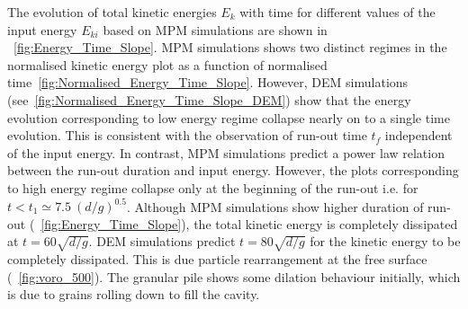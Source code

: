 The evolution of total kinetic energies $E_k$ with time for different values of 
the input energy $E_{ki}$ based on MPM simulations are shown in 
~\cref{fig:Energy_Time_Slope}. MPM simulations shows two distinct regimes in 
the normalised kinetic energy plot as a function of 
normalised time~\cref{fig:Normalised_Energy_Time_Slope}. However, DEM 
simulations (see~\cref{fig:Normalised_Energy_Time_Slope_DEM}) show that the 
energy evolution corresponding to low energy regime collapse nearly on to a 
single time evolution. This is consistent with the observation of run-out time 
$t_f$ independent of the input energy. In contrast, MPM simulations predict a 
power law relation between the run-out duration and input energy. However, the 
plots corresponding to high energy regime collapse only at the beginning of the 
run-out i.e. for $t < t_1 \simeq 7.5 \ (d/g)^{0.5}$. Although MPM simulations 
show higher duration of run-out (~\cref{fig:Energy_Time_Slope}), the total 
kinetic energy is completely dissipated at $t = 60 \sqrt{d/g}$. DEM simulations 
predict $t = 80 \sqrt{d/g}$ for the kinetic energy to be completely dissipated. 
This is due particle rearrangement at the free surface (~\cref{fig:voro_500}). 
The granular pile shows some dilation behaviour initially, which is due to 
grains rolling down to fill the cavity. 

